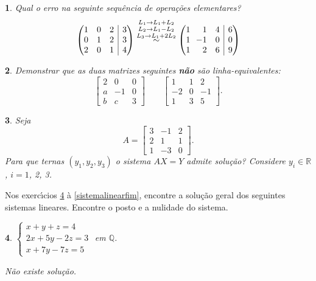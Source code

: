 \documentclass[12pt]{exam}
\makeatletter
\newenvironment{amatrix}[1]{%
  \left(\begin{array}{@{}*{#1}{r}|r@{}}
}{%
  \end{array}\right)
}
\newtheorem{exercicio}{}
\newcommand{\rac}{\mathbb{Q}}
\newcommand{\real}{\mathbb{R}}
\makeatother
\begin{document}
\begin{exercicio}
  Qual o erro na seguinte sequência de operações elementares?
    \begin{align*}
      \begin{amatrix}{3} 
        1 & 0 & 2 & 3 \\ 
        0 & 1 & 2& 3 \\
        2 & 0 & 1 & 4 \\
      \end{amatrix} 
      \stackrel{L_1 \to L_1+L_2}{
      \stackrel{L_2 \to L_1-L_2}{ 
      \stackrel{L_3 \to  L_1+2L_2}{\sim}}}
      \begin{amatrix}{3} 
      1 & 1 & 4 & 6 \\
      1 & \!\!-1 & 0& 0 \\
      1 & 2 & 6 & 9 
      \end{amatrix}
    \end{align*}
\end{exercicio}

\begin{exercicio}
  Demonstrar que as duas matrizes seguintes \textbf{n\~ao} s\~ao linha-equivalentes:
  \[
    \begin{bmatrix}
      2 & 0 & 0\\
      a & -1 & 0\\
      b & c & 3
    \end{bmatrix} \qquad
    \begin{bmatrix}
      1 & 1 & 2\\
      -2 & 0 & -1\\
      1 & 3 & 5
    \end{bmatrix}.
  \]
\end{exercicio}

\begin{exercicio}
  Seja
  \[
    A = \begin{bmatrix}
      3 & -1 & 2\\
      2 & 1 & 1\\
      1 & -3 & 0
    \end{bmatrix}.
  \]
  Para que ternas $(y_1, y_2, y_3)$ o sistema $AX = Y$ admite solu\c{c}\~ao? Considere $y_i \in \real$, $i=1$, 2, 3.
\end{exercicio}

Nos exerc{\'\i}cios \ref{sistemalinearinicio} \`a \ref{sistemalinearfim}, encontre a solu\c{c}\~ao geral dos seguintes sistemas lineares. Encontre o posto e a nulidade do sistema.
\begin{exercicio}\label{sistemalinearinicio}
$\begin{cases}
  x + y + z = 4\\
  2x + 5y - 2z = 3\\
  x + 7y - 7z = 5
\end{cases}$ em $\rac$.
\begin{solucao}
  N\~ao existe solu\c{c}\~ao.
\end{solucao}
\end{exercicio}
\end{document}

